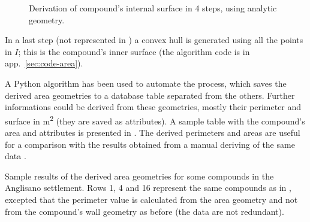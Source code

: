 \begin{figure}[H]

                \caption[Derivation of compound's internal surface using analytic geometry]{Derivation of compound's internal surface in 4 steps, using analytic geometry.}
                \label{fig:comp-iter}
            \end{figure}
            
            In a last step (not represented in ) a convex hull is generated using all the points in $I$; this is the compound's inner surface (the algorithm code is in app.~\ref{sec:code-area}).

            A Python algorithm has been used to automate the process, which saves the derived area geometries to a database table separated from the others. Further informations could be derived from these geometries, mostly their perimeter and surface in \si{\meter\squared} (they are saved as attributes). A sample table with the compound's area and attributes is presented in . The derived perimeters and areas are useful for a comparison with the results obtained from a manual deriving of the same data \cite{laterza}.

            \begin{table}[!htb]
                \centering
                
                \caption[Sample results of area geometries derived from compounds and their attributes for the Anglisano settlement.]{Sample results of the derived area geometries for some compounds in the Anglisano settlement. Rows 1, 4 and 16 represent the same compounds as in , excepted that the perimeter value is calculated from the area geometry and not from the compound's wall geometry as before (the data are not redundant).}
                \label{tab:tab-area-anglisano}
            \end{table}

